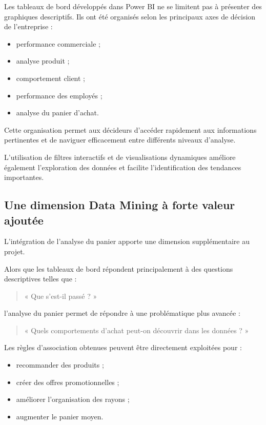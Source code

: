 \documentclass[12pt,a4paper,twoside]{report}
\begin{document}
Les tableaux de bord développés dans Power BI ne se limitent pas à présenter des graphiques descriptifs. Ils ont été organisés selon les principaux axes de décision de l'entreprise :

\begin{itemize}
    \item performance commerciale ;
    \item analyse produit ;
    \item comportement client ;
    \item performance des employés ;
    \item analyse du panier d'achat.
\end{itemize}

Cette organisation permet aux décideurs d'accéder rapidement aux informations pertinentes et de naviguer efficacement entre différents niveaux d'analyse.

L'utilisation de filtres interactifs et de visualisations dynamiques améliore également l'exploration des données et facilite l'identification des tendances importantes.

\subsection{Une dimension Data Mining à forte valeur ajoutée}

L'intégration de l'analyse du panier apporte une dimension supplémentaire au projet.

Alors que les tableaux de bord répondent principalement à des questions descriptives telles que :

\begin{quote}
« Que s'est-il passé ? »
\end{quote}

l'analyse du panier permet de répondre à une problématique plus avancée :

\begin{quote}
« Quels comportements d'achat peut-on découvrir dans les données ? »
\end{quote}

Les règles d'association obtenues peuvent être directement exploitées pour :

\begin{itemize}
    \item recommander des produits ;
    \item créer des offres promotionnelles ;
    \item améliorer l'organisation des rayons ;
    \item augmenter le panier moyen.
\end{itemize}
\end{document}
